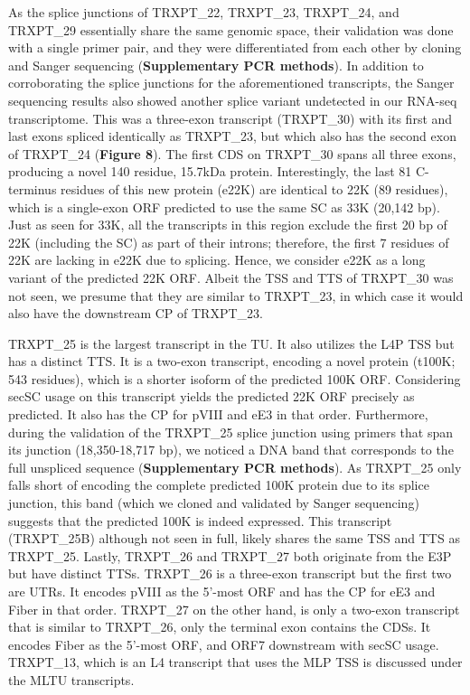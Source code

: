 \documentclass[
]{article}
\begin{document}
As the splice junctions of TRXPT\_22, TRXPT\_23, TRXPT\_24, and
TRXPT\_29 essentially share the same genomic space, their validation was
done with a single primer pair, and they were differentiated from each
other by cloning and Sanger sequencing (\textbf{Supplementary PCR
methods}). In addition to corroborating the splice junctions for the
aforementioned transcripts, the Sanger sequencing results also showed
another splice variant undetected in our RNA-seq transcriptome. This was
a three-exon transcript (TRXPT\_30) with its first and last exons
spliced identically as TRXPT\_23, but which also has the second exon of
TRXPT\_24 (\textbf{Figure 8}). The first CDS on TRXPT\_30 spans all
three exons, producing a novel 140 residue, 15.7kDa protein.
Interestingly, the last 81 C-terminus residues of this new protein
(e22K) are identical to 22K (89 residues), which is a single-exon ORF
predicted to use the same SC as 33K (20,142 bp). Just as seen for 33K,
all the transcripts in this region exclude the first 20 bp of 22K
(including the SC) as part of their introns; therefore, the first 7
residues of 22K are lacking in e22K due to splicing. Hence, we consider
e22K as a long variant of the predicted 22K ORF. Albeit the TSS and TTS
of TRXPT\_30 was not seen, we presume that they are similar to
TRXPT\_23, in which case it would also have the downstream CP of
TRXPT\_23.

TRXPT\_25 is the largest transcript in the TU. It also utilizes the L4P
TSS but has a distinct TTS. It is a two-exon transcript, encoding a
novel protein (t100K; 543 residues), which is a shorter isoform of the
predicted 100K ORF. Considering secSC usage on this transcript yields
the predicted 22K ORF precisely as predicted. It also has the CP for
pVIII and eE3 in that order. Furthermore, during the validation of the
TRXPT\_25 splice junction using primers that span its junction
(18,350-18,717 bp), we noticed a DNA band that corresponds to the full
unspliced sequence (\textbf{Supplementary PCR methods}). As TRXPT\_25
only falls short of encoding the complete predicted 100K protein due to
its splice junction, this band (which we cloned and validated by Sanger
sequencing) suggests that the predicted 100K is indeed expressed. This
transcript (TRXPT\_25B) although not seen in full, likely shares the
same TSS and TTS as TRXPT\_25. Lastly, TRXPT\_26 and TRXPT\_27 both
originate from the E3P but have distinct TTSs. TRXPT\_26 is a three-exon
transcript but the first two are UTRs. It encodes pVIII as the 5'-most
ORF and has the CP for eE3 and Fiber in that order. TRXPT\_27 on the
other hand, is only a two-exon transcript that is similar to TRXPT\_26,
only the terminal exon contains the CDSs. It encodes Fiber as the
5'-most ORF, and ORF7 downstream with secSC usage. TRXPT\_13, which is
an L4 transcript that uses the MLP TSS is discussed under the MLTU
transcripts.
\end{document}
